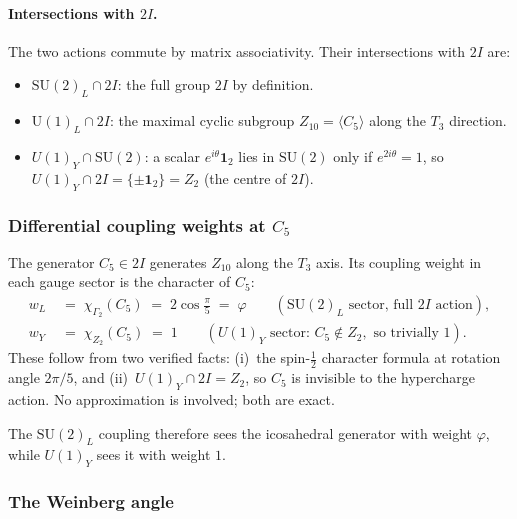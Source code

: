 \documentclass[11pt,a4paper]{article}
\theoremstyle{definition}
\theoremstyle{remark}
\newcommand{\vp}{\varphi}
\begin{document}
\paragraph{Intersections with $2I$.}
The two actions commute by matrix associativity.  Their intersections with
$2I$ are:
\begin{itemize}[noitemsep]
  \item $\mathrm{SU}(2)_L\cap 2I$: the full group $2I$ by definition.
  \item $\mathrm{U}(1)_L\cap 2I$: the maximal cyclic subgroup
    $Z_{10}=\langle C_5\rangle$ along the $T_3$ direction.
  \item $U(1)_Y\cap\mathrm{SU}(2)$: a scalar $e^{i\theta}\mathbf{1}_2$ lies
    in $\mathrm{SU}(2)$ only if $e^{2i\theta}=1$, so
    $U(1)_Y\cap 2I = \{\pm\mathbf{1}_2\} = Z_2$ (the centre of $2I$).
\end{itemize}
 
\subsubsection{Differential coupling weights at $C_5$}
\label{P1:sec:weights}
 
The generator $C_5\in 2I$ generates $Z_{10}$ along the $T_3$ axis.  Its
coupling weight in each gauge sector is the character of $C_5$:
\begin{align}
  w_L &\;=\; \chi_{\Gamma_2}(C_5) \;=\; 2\cos\!\tfrac{\pi}{5} \;=\; \vp
  \qquad(\mathrm{SU}(2)_L\text{ sector, full }2I\text{ action}),
  \label{P1:eq:wL}\\
  w_Y &\;=\; \chi_{Z_2}(C_5) \;=\; 1
  \qquad(U(1)_Y\text{ sector: }C_5\notin Z_2,\text{ so trivially }1).
  \label{P1:eq:wY}
\end{align}
These follow from two verified facts: (i)~the spin-$\tfrac{1}{2}$
character formula at rotation angle $2\pi/5$, and
(ii)~$U(1)_Y\cap 2I = Z_2$, so $C_5$ is invisible to the hypercharge
action.  No approximation is involved; both are exact.
 
The $\mathrm{SU}(2)_L$ coupling therefore sees the icosahedral generator
with weight $\vp$, while $U(1)_Y$ sees it with weight $1$.
 
\subsubsection{The Weinberg angle}
\label{P1:sec:weinberg_obs}
\end{document}
